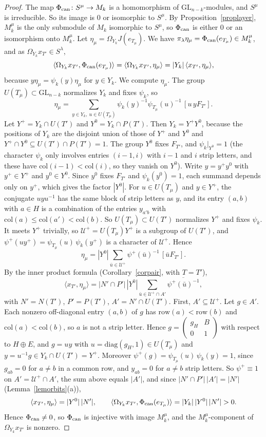 \documentclass[11pt, letterpaper]{amsart}
\theoremstyle{definition}
\theoremstyle{remark}
\newcommand{\GL}{\mathrm{GL}}
\newcommand{\row}{\mathrm{row}}
\newcommand{\col}{\mathrm{col}}
\begin{document}
\begin{proof}
The map $\Phi_{\rm can}\colon S^\mu\to M_k$ is a homomorphism of $\GL_{n-k}$-modules, and $S^\mu$ is irreducible. So its image is $0$ or isomorphic to $S^\mu$. By Proposition~\ref{proplayer}, $M_k^\mu$ is the only submodule of $M_k$ isomorphic to $S^\mu$, so $\Phi_{\rm can}$ is either $0$ or an isomorphism onto $M_k^\mu$. Let $\eta_\mu=\Omega_{Y_k}J(e_{T_\mu})$. We have $\pi_\lambda \eta_\mu=\Phi_{\rm can}(e_{T_\mu})\in M_k^\mu$, and as $\Omega_{Y_k}x_{T'}\in S^\lambda$,
\[
\langle \Omega_{Y_k}x_{T'},\Phi_{\rm can}(e_{T_\mu})\rangle=\langle \Omega_{Y_k}x_{T'},\eta_\mu\rangle=|Y_k|\,\langle x_{T'},\eta_\mu\rangle,
\]
because $y\eta_\mu=\psi_k(y)\eta_\mu$ for $y\in Y_k$. We compute $\eta_\mu$. The group $U(T_\mu)\subset\GL_{n-k}$ normalizes $Y_k$ and fixes $\psi_k$, so
\[
\eta_\mu=\sum_{y\in Y_k,\ u\in U(T_\mu)}\psi_k(y)^{-1}\psi_{T_\mu}(u)^{-1}\,[u\,yF_{T'}].
\]
Let $Y^+=Y_k\cap U(T')$ and $Y^0=Y_k\cap P(T')$. Then $Y_k=Y^+Y^0$, because the positions of $Y_k$ are the disjoint union of those of $Y^+$ and $Y^0$ and $Y^+\cap Y^0\subseteq U(T')\cap P(T')=1$. The group $Y^0$ fixes $F_{T'}$, and $\psi_k|_{Y^0}=1$ (the character $\psi_k$ only involves entries $(i-1,i)$ with $i-1$ and $i$ strip letters, and these have $\col(i-1)<\col(i)$, so they vanish on $Y^0$). Write $y=y^+y^0$ with $y^+\in Y^+$ and $y^0\in Y^0$. Since $y^0$ fixes $F_{T'}$ and $\psi_k(y^0)=1$, each summand depends only on $y^+$, which gives the factor $|Y^0|$. For $u\in U(T_\mu)$ and $y\in Y^+$, the conjugate $uyu^{-1}$ has the same block of strip letters as $y$, and its entry $(a,b)$ with $a\in H$ is a combination of the entries $y_{a'b}$ with $\col(a)\le\col(a')<\col(b)$. So $U(T_\mu)\subset U(T')$ normalizes $Y^+$ and fixes $\psi_k$. It meets $Y^+$ trivially, so $\mathcal U^+=U(T_\mu)Y^+$ is a subgroup of $U(T')$, and $\psi^+(uy^+)=\psi_{T_\mu}(u)\,\psi_k(y^+)$ is a character of $\mathcal U^+$. Hence
\[
\eta_\mu=|Y^0|\sum_{\bar u\in\mathcal U^+}\psi^+(\bar u)^{-1}\,[\bar uF_{T'}].
\]
By the inner product formula (Corollary~\ref{corpair}, with $T=T'$),
\[
\langle x_{T'},\eta_\mu\rangle=|N'\cap P'|\,|Y^0|\sum_{\bar u\in\mathcal U^+\cap A'}\overline{\psi^+(\bar u)^{-1}},
\]
with $N'=N(T')$, $P'=P(T')$, $A'=N'\cap U(T')$. First, $A'\subseteq\mathcal U^+$. Let $g\in A'$. Each nonzero off-diagonal entry $(a,b)$ of $g$ has $\row(a)<\row(b)$ and $\col(a)<\col(b)$, so $a$ is not a strip letter. Hence $g=\begin{pmatrix}g_H&B\\0&1\end{pmatrix}$ with respect to $H\oplus E$, and $g=uy$ with $u=\mathrm{diag}(g_H,1)\in U(T_\mu)$ and $y=u^{-1}g\in Y_k\cap U(T')=Y^+$. Moreover $\psi^+(g)=\psi_{T_\mu}(u)\,\psi_k(y)=1$, since $g_{ab}=0$ for $a\ne b$ in a common row, and $y_{ab}=0$ for $a\ne b$ strip letters. So $\psi^+\equiv1$ on $A'=\mathcal U^+\cap A'$, the sum above equals $|A'|$, and since $|N'\cap P'|\,|A'|=|N'|$ (Lemma~\ref{lemorbits}(a)),
\[
\langle x_{T'},\eta_\mu\rangle=|Y^0|\,|N'|,\qquad\langle \Omega_{Y_k}x_{T'},\Phi_{\rm can}(e_{T_\mu})\rangle=|Y_k|\,|Y^0|\,|N'|>0.
\]
Hence $\Phi_{\rm can}\ne0$, so $\Phi_{\rm can}$ is injective with image $M_k^\mu$, and the $M_k^\mu$-component of $\Omega_{Y_k}x_{T'}$ is nonzero.
\end{proof}
\end{document}
